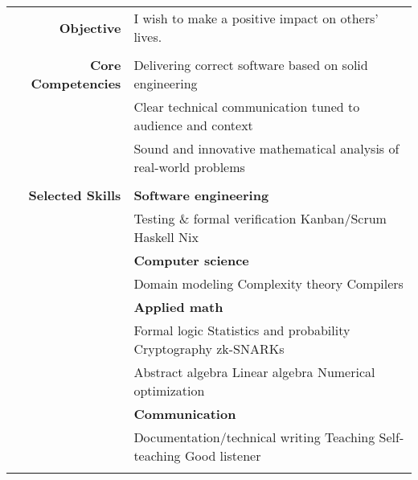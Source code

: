 \documentclass{article}
\newcommand\spc{\hspace{8pt}}
\begin{document}
\bgroup
\begin{tabular}{rl}
  \def\arraystrech{1.5}
  {\bf Objective} & I wish to make a positive impact on others' lives. \\ \\
  {\bf Core Competencies} & Delivering correct software based on solid engineering \\
   & Clear technical communication tuned to audience and context \\
  & Sound and innovative mathematical analysis of real-world problems \\ \\

  {\bf Selected Skills}  & {\bf Software engineering} \\
	& Testing \& formal verification \spc Kanban/Scrum \spc Haskell \spc Nix \\
  & {\bf Computer science} \\
  & Domain modeling \spc Complexity theory \spc Compilers \\
  & {\bf Applied math} \\
  & Formal logic \spc Statistics and probability \spc Cryptography \spc zk-SNARKs \\
  & Abstract algebra \spc Linear algebra \spc Numerical optimization \\
  & {\bf Communication} \\
  & Documentation/technical writing \spc Teaching \spc Self-teaching \spc Good listener \\ \\


\end{tabular}
\end{document}
